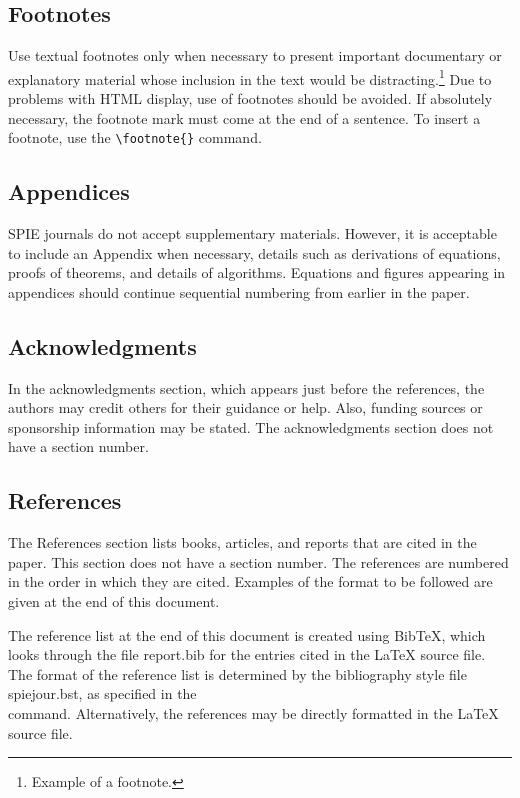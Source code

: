 \subsection{Footnotes} 
Use textual footnotes only when necessary to present important documentary or explanatory material whose inclusion in the text would be distracting.\footnote{Example of a footnote.} Due to problems with HTML display, use of footnotes should be avoided. If absolutely necessary, the footnote mark must come at the end of a sentence. To insert a footnote, use the {\verb|\footnote{}|} command.

\subsection{Appendices} 
SPIE journals do not accept supplementary materials. However, it is acceptable to include an Appendix when necessary,  details such as derivations of equations, proofs of theorems, and details of algorithms. Equations and figures appearing in appendices should continue sequential numbering from earlier in the paper.

\subsection{Acknowledgments} 
In the acknowledgments section, which appears just before the references, the authors may credit others for their guidance or help. Also, funding sources or sponsorship information may be stated. The acknowledgments section does not have a section number.

\subsection{References} 
The References section lists books, articles, and reports that are cited in the paper. This section does not have a section number. The references are numbered in the order in which they are cited. Examples of the format to be followed are given at the end of this document.

The reference list at the end of this document is created using BibTeX, which looks through the file {\ttfamily report.bib} for the entries cited in the LaTeX source file.  The format of the reference list is determined by the bibliography style file {\ttfamily spiejour.bst}, as specified in the \\ \verb|| command.  Alternatively, the references may be directly formatted in the LaTeX source file.

